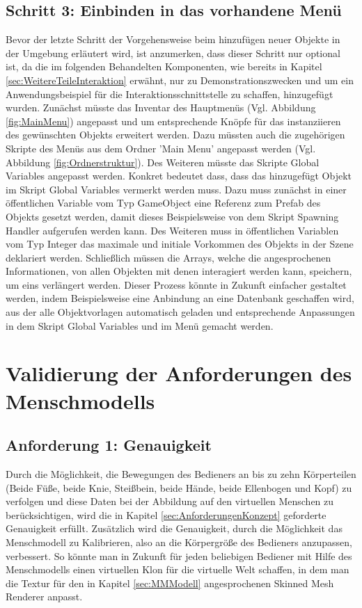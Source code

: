 \subsection{Schritt 3: Einbinden in das vorhandene Menü}\label{sec:ObjekteEinbinden3}
Bevor der letzte Schritt der Vorgehensweise beim hinzufügen neuer Objekte in der Umgebung erläutert wird, ist anzumerken, dass dieser Schritt nur optional ist, da die im folgenden Behandelten Komponenten, wie bereits in Kapitel \ref{sec:WeitereTeileInteraktion} erwähnt, nur zu Demonstrationszwecken und um ein Anwendungsbeispiel für die Interaktionsschnittstelle zu schaffen, hinzugefügt wurden. Zunächst müsste das Inventar des Hauptmenüs (Vgl. Abbildung \ref{fig:MainMenu}) angepasst und um entsprechende Knöpfe für das instanziieren des gewünschten Objekts erweitert werden. Dazu müssten auch die zugehörigen Skripte des Menüs aus dem Ordner 'Main Menu' angepasst werden (Vgl. Abbildung \ref{fig:Ordnerstruktur}). Des Weiteren müsste das Skripte Global Variables angepasst werden. Konkret bedeutet dass, dass das hinzugefügt Objekt im Skript Global Variables vermerkt werden muss. Dazu muss zunächst in einer öffentlichen Variable vom Typ GameObject eine Referenz zum Prefab des Objekts gesetzt werden, damit dieses Beispielsweise von dem Skript Spawning Handler aufgerufen werden kann. Des Weiteren muss in öffentlichen Variablen vom Typ Integer das maximale und initiale Vorkommen des Objekts in der Szene deklariert werden. Schließlich müssen die Arrays, welche die angesprochenen Informationen, von allen Objekten mit denen interagiert werden kann, speichern, um eins verlängert werden. Dieser Prozess könnte in Zukunft einfacher gestaltet werden, indem Beispielsweise eine Anbindung an eine Datenbank geschaffen wird, aus der alle Objektvorlagen automatisch geladen und entsprechende Anpassungen in dem Skript Global Variables und im Menü gemacht werden.

\section{Validierung der Anforderungen des Menschmodells}\label{sec:ValidMensch}

\subsection{Anforderung 1: Genauigkeit}\label{sec:ValidMensch1}
Durch die Möglichkeit, die Bewegungen des Bedieners an bis zu zehn Körperteilen (Beide Füße, beide Knie, Steißbein, beide Hände, beide Ellenbogen und Kopf) zu verfolgen und diese Daten bei der Abbildung auf den virtuellen Menschen zu berücksichtigen, wird die in Kapitel \ref{sec:AnforderungenKonzept} geforderte Genauigkeit erfüllt. Zusätzlich wird die Genauigkeit, durch die Möglichkeit das Menschmodell zu Kalibrieren, also an die Körpergröße des Bedieners anzupassen, verbessert. So könnte man in Zukunft für jeden beliebigen Bediener mit Hilfe des Menschmodells einen virtuellen Klon für die virtuelle Welt schaffen, in dem man die Textur für den in Kapitel \ref{sec:MMModell} angesprochenen Skinned Mesh Renderer anpasst.


